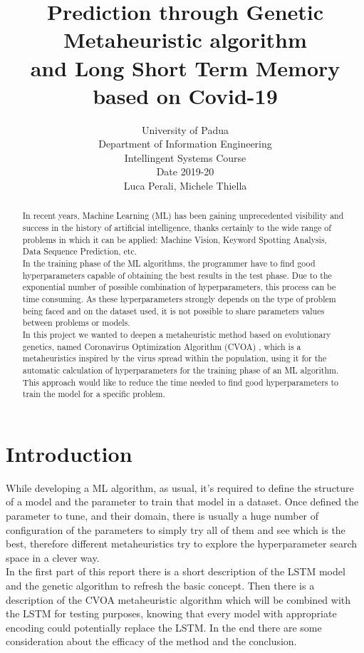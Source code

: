\documentclass[letterpaper]{article}%
\title{Prediction through Genetic Metaheuristic algorithm \\ and Long Short Term Memory based on Covid-19}
\author{ University of Padua \\ Department of Information Engineering \\ Intellingent Systems Course \\ Date 2019-20 \\ %
Luca Perali, Michele Thiella
}
\begin{document}
\maketitle

\begin{abstract}
	In recent years, Machine Learning (ML) has been gaining unprecedented visibility and success in the history of artificial intelligence, thanks certainly to the wide range of problems in which it can be applied: Machine Vision, Keyword Spotting Analysis, Data Sequence Prediction, etc. \\
	In the training phase of the ML algorithms, the programmer have to find good hyperparameters capable of obtaining the best results in the test phase. Due to the exponential number of possible combination of hyperparameters, this process can be time consuming. As these hyperparameters strongly depends on the type of problem being faced and on the dataset used, it is not possible to share parameters values between problems or models. \\
	In this project we wanted to deepen a metaheuristic method based on evolutionary genetics, named Coronavirus Optimization Algorithm (CVOA) \cite{martnezlvarez2020coronavirus}, which is a metaheuristics inspired by the virus spread within the population, using it for the automatic calculation of hyperparameters for the training phase of an ML algorithm. This approach would like to reduce the time needed to find good hyperparameters to train the model for a specific problem.
	
\end{abstract}

\section{Introduction}
	While developing a ML algorithm, as usual, it's required to define the structure of a model and the parameter to train that model in a dataset. Once defined the parameter to tune, and their domain, there is usually a huge number of configuration of the parameters to simply try all of them and see which is the best, therefore different metaheuristics try to explore the hyperparameter search space in a clever way. \\
	In the first part of this report there is a short description of the LSTM model and the genetic algorithm to refresh the basic concept. Then there is a description of the CVOA metaheuristic algorithm which will be combined with the LSTM for testing purposes, knowing that every model with appropriate encoding could potentially replace the LSTM. In the end there are some consideration about the efficacy of the method and the conclusion. 
	
\end{document}
